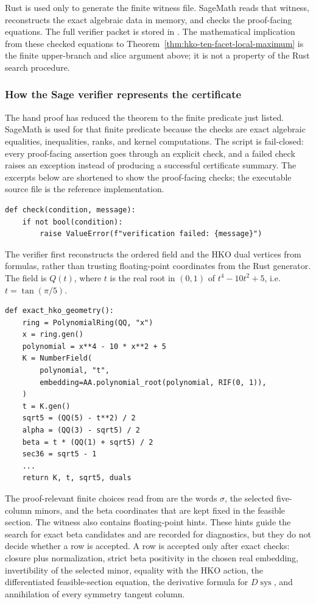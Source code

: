 Rust is used only to generate the finite witness file. SageMath reads that
witness, reconstructs the exact algebraic data in memory, and checks the
proof-facing equations. The full verifier packet is stored in
. The mathematical implication
from these checked equations to
Theorem~\ref{thm:hko-ten-facet-local-maximum} is the finite upper-branch and
slice argument above; it is not a property of the Rust search procedure.

\subsubsection*{How the Sage verifier represents the certificate}

The hand proof has reduced the theorem to the finite predicate just listed.
SageMath is used for that finite predicate because the checks are exact
algebraic equalities, inequalities, ranks, and kernel computations. The script
 is fail-closed: every proof-facing assertion goes through
an explicit check, and a failed check raises an exception instead of producing
a successful certificate summary. The excerpts below are shortened to show the
proof-facing checks; the executable source file is the reference
implementation.

\begin{verbatim}
def check(condition, message):
    if not bool(condition):
        raise ValueError(f"verification failed: {message}")
\end{verbatim}

The verifier first reconstructs the ordered field and the HKO dual vertices
from formulas, rather than trusting floating-point coordinates from the Rust
generator. The field is \(Q(t)\), where \(t\) is the real root in \((0,1)\) of
\(t^4-10t^2+5\), i.e. \(t=\tan(\pi/5)\).

\begin{verbatim}
def exact_hko_geometry():
    ring = PolynomialRing(QQ, "x")
    x = ring.gen()
    polynomial = x**4 - 10 * x**2 + 5
    K = NumberField(
        polynomial, "t",
        embedding=AA.polynomial_root(polynomial, RIF(0, 1)),
    )
    t = K.gen()
    sqrt5 = (QQ(5) - t**2) / 2
    alpha = (QQ(3) - sqrt5) / 2
    beta = t * (QQ(1) + sqrt5) / 2
    sec36 = sqrt5 - 1
    ...
    return K, t, sqrt5, duals
\end{verbatim}

The proof-relevant finite choices read from  are the words
\(\sigma\), the selected five-column minors, and the beta coordinates that are
kept fixed in the feasible section. The witness also contains floating-point
hints. These hints guide the search for exact beta candidates and are recorded
for diagnostics, but they do not decide whether a row is accepted. A row is
accepted only after exact checks: closure plus normalization, strict beta
positivity in the chosen real embedding, invertibility of the selected minor,
equality with the HKO action, the differentiated feasible-section equation,
the derivative formula for \(D\operatorname{sys}\), and annihilation of every
symmetry tangent column.

